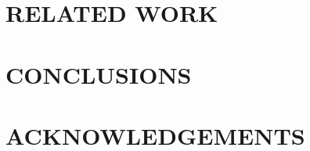 \documentclass{sigchi}
\begin{document}
\section{RELATED WORK}
\label{relatedwork}



\section{CONCLUSIONS}
\label{conclusions}







\section{ACKNOWLEDGEMENTS}




\balance


\end{document}
